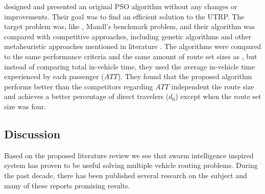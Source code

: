 \citet{kechagiopoulos14} designed and presented an original PSO algorithm without any changes or improvements. Their goal was to find an efficient solution to the UTRP. The target problem was, like \citet{nikolic14}, Mandl's benchmark problem, and their algorithm was compared with competitive approaches, including genetic algorithms and other metaheuristic approaches mentioned in literature \citep{baaj91, chakroborty02, kidwai98, fan10, fan09-2, zhang10, chew12}. The algorithms were compared to the same performance criteria and the same amount of route set sizes as \citet{nikolic14}, but instead of comparing total in-vehicle time, they used the average in-vehicle time experienced by each passenger ($ATT$). They found that the proposed algorithm performs better than the competitors regarding $ATT$ independent the route size and achieves a better percentage of direct travelers ($d_0$) except when the route set size was four. 

\subsection{Discussion}

Based on the proposed literature review we see that swarm intelligence inspired system has proven to be useful solving multiple vehicle routing problems. During the past decade, there has been published several research on the subject and many of these reports promising results. 

